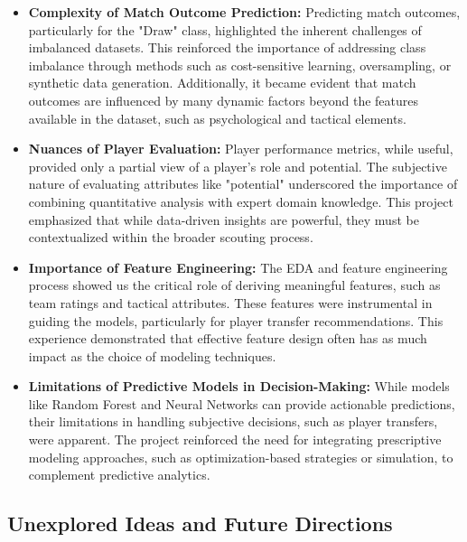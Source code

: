 \documentclass{article}
\begin{document}
\begin{itemize}
    \item \textbf{Complexity of Match Outcome Prediction:} Predicting match outcomes, particularly for the "Draw" class, highlighted the inherent challenges of imbalanced datasets. This reinforced the importance of addressing class imbalance through methods such as cost-sensitive learning, oversampling, or synthetic data generation. Additionally, it became evident that match outcomes are influenced by many dynamic factors beyond the features available in the dataset, such as psychological and tactical elements.

    \item \textbf{Nuances of Player Evaluation:} Player performance metrics, while useful, provided only a partial view of a player's role and potential. The subjective nature of evaluating attributes like "potential" underscored the importance of combining quantitative analysis with expert domain knowledge. This project emphasized that while data-driven insights are powerful, they must be contextualized within the broader scouting process.

    \item \textbf{Importance of Feature Engineering:} The EDA and feature engineering process showed us the critical role of deriving meaningful features, such as team ratings and tactical attributes. These features were instrumental in guiding the models, particularly for player transfer recommendations. This experience demonstrated that effective feature design often has as much impact as the choice of modeling techniques.

    \item \textbf{Limitations of Predictive Models in Decision-Making:} While models like Random Forest and Neural Networks can provide actionable predictions, their limitations in handling subjective decisions, such as player transfers, were apparent. The project reinforced the need for integrating prescriptive modeling approaches, such as optimization-based strategies or simulation, to complement predictive analytics.

\end{itemize}

\subsection{Unexplored Ideas and Future Directions}
\end{document}
